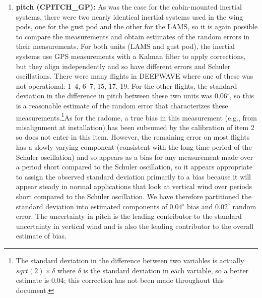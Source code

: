 \documentclass[12pt,twoside,english]{article}\usepackage[]{graphicx}\usepackage[]{color}
\let\OrgIndex\index
\renewcommand*{\index}[1]{\OrgIndex{#1}}
\begin{document}
{{\begin{enumerate}
\item \textbf{pitch (CPITCH\_GP):} As was the case for the cabin-mounted inertial systems, there were two nearly identical inertial systems used in the wing pods, one for the gust pod and the other for the LAMS, so it is again possible to compare the measurements and obtain estimates of the random errors in their measurements. For both units (LAMS and gust pod), the inertial systems use GPS measurements with a Kalman filter to apply corrections, but they align independently and so have different errors and Schuler oscillations. There were many flights in DEEPWAVE where one of these was not operational: 1--4, 6--7, 15, 17, 19. For the other flights, the standard deviation in the difference in pitch between these two units was 0.06$^{\circ}$, so this is a reasonable estimate of the random error that characterizes these measurements.\footnote{The standard deviation in the difference between two variables is actually $sqrt(2)\times\delta$ where $\delta$ is the standard deviation in each variable, so a better estimate is 0.04; this correction has not been made throughout this document.}As for the radome, a true bias in this measurement (e.g., from misalignment at installation) has been subsumed by the calibration of item 2 so does not enter in this item. However, the remaining error on most flights has a slowly varying component (consistent with the long time period of the Schuler oscillation) and so appears as a bias for any measurement made over a period short compared to the Schuler oscillation, so it appears appropriate to assign the observed standard deviation primarily to a bias because it will appear steady in normal applications that look at vertical wind over periods short compared to the Schuler oscillation. We have therefore partitioned the standard deviation into estimated components of 0.04$^{\circ}$ bias and $0.02^{\circ}$ random error. The uncertainty in pitch is the leading contributor to the standard uncertainty in vertical wind and is also the leading contributor to the overall estimate of bias. 


\end{enumerate}}}
\end{document}
